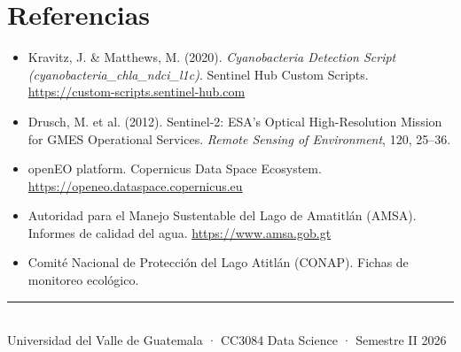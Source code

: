 \documentclass[12pt, a4paper]{article}
\begin{document}
\section*{Referencias}

\begin{itemize}[leftmargin=1.5em]
  \item Kravitz, J. \& Matthews, M. (2020). \emph{Cyanobacteria Detection Script (cyanobacteria\_chla\_ndci\_l1c)}. Sentinel Hub Custom Scripts. \url{https://custom-scripts.sentinel-hub.com}

  \item Drusch, M. et al. (2012). Sentinel-2: ESA's Optical High-Resolution Mission for GMES Operational Services. \emph{Remote Sensing of Environment}, 120, 25--36.

  \item openEO platform. Copernicus Data Space Ecosystem. \url{https://openeo.dataspace.copernicus.eu}

  \item Autoridad para el Manejo Sustentable del Lago de Amatitlán (AMSA). Informes de calidad del agua. \url{https://www.amsa.gob.gt}

  \item Comité Nacional de Protección del Lago Atitlán (CONAP). Fichas de monitoreo ecológico.
\end{itemize}

\vfill
\begin{center}
  {\color{uvgblue}\rule{0.6\linewidth}{0.4pt}}\\[4pt]
  {\small Universidad del Valle de Guatemala · CC3084 Data Science · Semestre II 2026}
\end{center}
\end{document}
